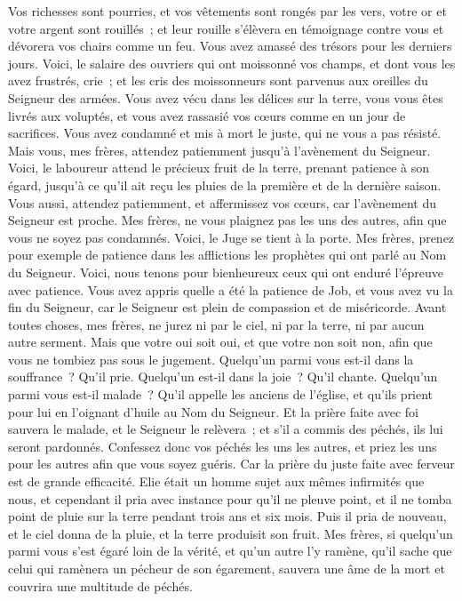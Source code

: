 \begin{multicols}{2}
Vos richesses sont pourries, et vos vêtements sont rongés par les vers,
votre or et votre argent sont rouillés~; et leur rouille s'élèvera en témoignage contre vous et dévorera vos chairs comme un feu. Vous avez amassé des trésors pour les derniers jours.
Voici, le salaire des ouvriers qui ont moissonné vos champs, et dont vous les avez frustrés, crie~; et les cris des moissonneurs sont parvenus aux oreilles du Seigneur des armées.
Vous avez vécu dans les délices sur la terre, vous vous êtes livrés aux voluptés, et vous avez rassasié vos cœurs comme en un jour de sacrifices.
Vous avez condamné et mis à mort le juste, qui ne vous a pas résisté.
Mais vous, mes frères, attendez patiemment jusqu'à l'avènement du Seigneur. Voici, le laboureur attend le précieux fruit de la terre, prenant patience à son égard, jusqu'à ce qu'il ait reçu les pluies de la première et de la dernière saison.
Vous aussi, attendez patiemment, et affermissez vos cœurs, car l'avènement du Seigneur est proche.
Mes frères, ne vous plaignez pas les uns des autres, afin que vous ne soyez pas condamnés. Voici, le Juge se tient à la porte.
Mes frères, prenez pour exemple de patience dans les afflictions les prophètes qui ont parlé au Nom du Seigneur.
Voici, nous tenons pour bienheureux ceux qui ont enduré l'épreuve avec patience. Vous avez appris quelle a été la patience de Job, et vous avez vu la fin du Seigneur, car le Seigneur est plein de compassion et de miséricorde.
Avant toutes choses, mes frères, ne jurez ni par le ciel, ni par la terre, ni par aucun autre serment. Mais que votre oui soit oui, et que votre non soit non, afin que vous ne tombiez pas sous le jugement.
Quelqu'un parmi vous est-il dans la souffrance~? Qu'il prie. Quelqu'un est-il dans la joie~? Qu'il chante.
Quelqu'un parmi vous est-il malade~? Qu'il appelle les anciens de l'église, et qu'ils prient pour lui en l'oignant d'huile au Nom du Seigneur.
Et la prière faite avec foi sauvera le malade, et le Seigneur le relèvera~; et s'il a commis des péchés, ils lui seront pardonnés.
Confessez donc vos péchés les uns les autres, et priez les uns pour les autres afin que vous soyez guéris. Car la prière du juste faite avec ferveur est de grande efficacité.
Elie était un homme sujet aux mêmes infirmités que nous, et cependant il pria avec instance pour qu'il ne pleuve point, et il ne tomba point de pluie sur la terre pendant trois ans et six mois.
Puis il pria de nouveau, et le ciel donna de la pluie, et la terre produisit son fruit.
Mes frères, si quelqu'un parmi vous s'est égaré loin de la vérité, et qu'un autre l'y ramène,
qu'il sache que celui qui ramènera un pécheur de son égarement, sauvera une âme de la mort et couvrira une multitude de péchés.
\PPE{}
\end{multicols}
